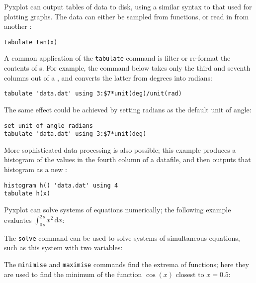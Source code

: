 
Pyxplot can output tables of data to disk, using a similar syntax to that used
for plotting graphs. The data can either be sampled from functions, or read in
from another \datafile:

\begin{verbatim}
tabulate tan(x)
\end{verbatim}

\noindent A common application of the {\tt tabulate} command is filter or
re-format the contents of \datafile s. For example, the command below takes
only the third and seventh columns out of a \datafile, and converts the latter
from degrees into radians:

\begin{verbatim}
tabulate 'data.dat' using 3:$7*unit(deg)/unit(rad)
\end{verbatim}

\noindent The same effect could be achieved by setting radians as the default
unit of angle:

\begin{verbatim}
set unit of angle radians
tabulate 'data.dat' using 3:$7*unit(deg)
\end{verbatim}

\noindent More sophisticated data processing is also possible; this example
produces a histogram of the values in the fourth column of a datafile, and then
outputs that histogram as a new \datafile:

\begin{verbatim}
histogram h() 'data.dat' using 4
tabulate h(x)
\end{verbatim}


Pyxplot can solve systems of equations numerically; the following example
evaluates $\int_{0\,\mathrm{s}}^{2\,\mathrm{s}} x^2\,\mathrm{d}x$:

\vspace{3mm}

\vspace{3mm}

\noindent The {\tt solve} command can be used to solve systems of simultaneous equations, such as this system with two variables:

\vspace{3mm}

\vspace{3mm}

\noindent The {\tt minimise} and {\tt maximise} commands find the extrema of functions; here they are used to find the minimum of the function $\cos(x)$ closest to $x=0.5$:

